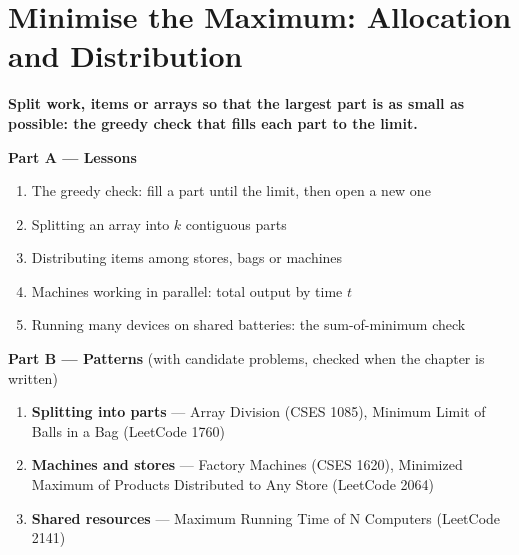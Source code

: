\chapter{Minimise the Maximum: Allocation and Distribution}
\label{ch:minimax}

\begin{tcolorbox}[enhanced, colback=white, colframe=secondaryblue, boxrule=1pt, arc=2mm]
\textbf{\large\textcolor{primaryblue}{Split work, items or arrays so that the largest part is as small as possible: the greedy check that fills each part to the limit.}}
\end{tcolorbox}


\begin{plannedbox}
\textbf{Part A --- Lessons}
\begin{enumerate}[leftmargin=*, label=\textbf{A\arabic*.}, itemsep=1pt]
    \item The greedy check: fill a part until the limit, then open a new one
    \item Splitting an array into $k$ contiguous parts
    \item Distributing items among stores, bags or machines
    \item Machines working in parallel: total output by time $t$
    \item Running many devices on shared batteries: the sum-of-minimum check
\end{enumerate}
\textbf{Part B --- Patterns} (with candidate problems, checked when the chapter is written)
\begin{enumerate}[leftmargin=*, label=\textbf{P\arabic*.}, itemsep=1pt]
    \item \textbf{Splitting into parts} --- Array Division {\small\color{darkgray}(CSES 1085)}, Minimum Limit of Balls in a Bag {\small\color{darkgray}(LeetCode 1760)}
    \item \textbf{Machines and stores} --- Factory Machines {\small\color{darkgray}(CSES 1620)}, Minimized Maximum of Products Distributed to Any Store {\small\color{darkgray}(LeetCode 2064)}
    \item \textbf{Shared resources} --- Maximum Running Time of N Computers {\small\color{darkgray}(LeetCode 2141)}
\end{enumerate}
\end{plannedbox}
